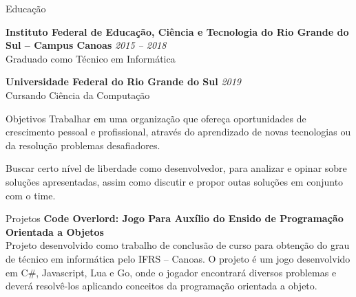 \documentclass{resume} %
\begin{document}

\begin{rSection}{Educação}

{\bf Instituto Federal de Educação, Ciência e Tecnologia do Rio Grande do Sul -- Campus Canoas} \hfill {\em 2015 -- 2018} 
\\ Graduado como Técnico em Informática

{\bf Universidade Federal do Rio Grande do Sul} \hfill {\em 2019} 
\\ Cursando Ciência da Computação

\end{rSection}

\begin{rSection}{Objetivos}
Trabalhar em uma organização que ofereça oportunidades de crescimento pessoal e profissional, através do aprendizado de novas tecnologias ou da resolução problemas desafiadores.

Buscar certo nível de liberdade como desenvolvedor, para analizar e opinar sobre soluções apresentadas, assim como discutir e propor outas soluções em conjunto com o time.
\end{rSection}

\begin{rSection}{Projetos}
{\bf Code Overlord: Jogo Para Auxílio do Ensido de Programação Orientada a Objetos}\\
Projeto desenvolvido como trabalho de conclusão de curso para obtenção do grau de técnico em informática pelo IFRS -- Canoas. O projeto é um jogo desenvolvido em C\#, Javascript, Lua e Go, onde o jogador encontrará diversos problemas e deverá resolvê-los aplicando conceitos da programação orientada a objeto.
\end{rSection}


\end{document}
